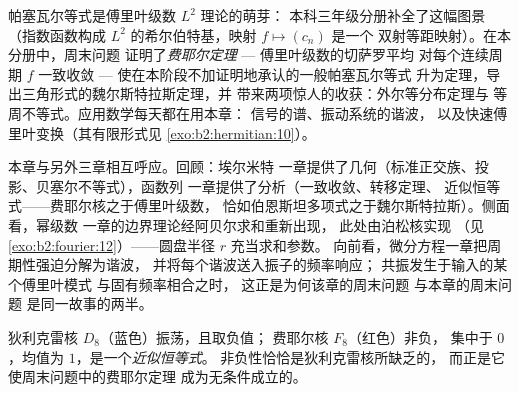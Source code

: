 \begin{remark}[应用场合]
帕塞瓦尔等式是傅里叶级数 $L^2$ 理论的萌芽：
本科三年级分册补全了这幅图景（指数函数构成
$L^2$ 的希尔伯特基，映射 $f \mapsto (c_n)$ 是一个
双射等距映射）。在本分册中，周末问题
证明了\emph{费耶尔定理} --- 傅里叶级数的切萨罗平均
对每个连续周期
$f$ 一致收敛 --- 使在本阶段不加证明地承认的一般帕塞瓦尔等式
升为定理，导出三角形式的魏尔斯特拉斯定理，并
带来两项惊人的收获：外尔等分布定理与
等周不等式。应用数学每天都在用本章：
信号的谱、振动系统的谐波，
以及快速傅里叶变换（其有限形式见
\cref{exo:b2:hermitian:10}）。
\end{remark}

\begin{remark}[本分册中的视角]
本章与另外三章相互呼应。回顾：埃尔米特
一章提供了几何（标准正交族、投影、贝塞尔不等式），函数列
一章提供了分析（一致收敛、转移定理、
近似恒等式——费耶尔核之于傅里叶级数，
恰如伯恩斯坦多项式之于魏尔斯特拉斯）。侧面看，幂级数
一章的边界理论经阿贝尔求和重新出现，
此处由泊松核实现
（见\cref{exo:b2:fourier:12}）——圆盘半径 $r$ 充当求和参数。
向前看，微分方程一章把周期性强迫分解为谐波，
并将每个谐波送入振子的频率响应；
共振发生于输入的某个傅里叶模式
与固有频率相合之时，
这正是为何该章的周末问题
与本章的周末问题
是同一故事的两半。
\end{remark}

\begin{omfigure}

{\small 狄利克雷核 $D_8$（蓝色）振荡，且取负值；
费耶尔核 $F_8$（红色）非负，
集中于 $0$，均值为 $1$，是一个\emph{近似恒等式}。
非负性恰恰是狄利克雷核所缺乏的，
而正是它使周末问题中的费耶尔定理
成为无条件成立的。}
\end{omfigure}

